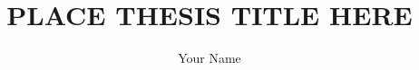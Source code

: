 
\titlepgtrue %
\signaturepagetrue %
\copyrighttrue %
\abswithesistrue %
\acktrue %
\tablecontentstrue %
\tablespagetrue %
\figurespagetrue %

\title{PLACE THESIS TITLE HERE} %
\author{Your Name} %

\newcommand{\abstextwithesis}
{Basic abstract goes here. Can use paragraphs and normal \LaTeX
commands.

For example, I looked at the problem $a^n+b^n=c^n$ and found some
integer solutions for $n>2$! Suck on that Fermat!}

\newcommand{\acknowledgement}
{Thank all your helpers here.}


\beforepreface
\afterpreface
